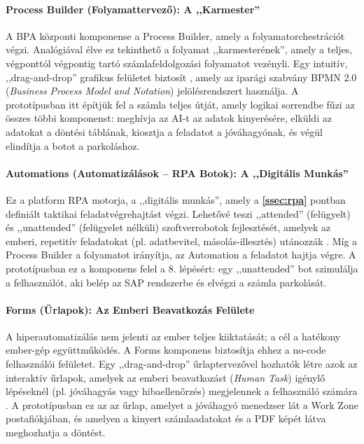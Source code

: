 \paragraph{Process Builder (Folyamattervező): A ,,Karmester''}
A BPA központi komponense a Process Builder, amely a folyamatorchestrációt végzi. Analógiával élve ez tekinthető a folyamat ,,karmesterének'', amely a teljes, végponttól végpontig tartó számlafeldolgozási folyamatot vezényli.
Egy intuitív, ,,drag-and-drop'' grafikus felületet biztosít \cite{SAP-Build}, amely az iparági szabvány BPMN 2.0 (\textit{Business Process Model and Notation}) jelölésrendszert használja.
A prototípusban itt építjük fel a számla teljes útját, amely logikai sorrendbe fűzi az összes többi komponenst: meghívja az AI-t az adatok kinyerésére, elküldi az adatokat a döntési táblának, kiosztja a feladatot a jóváhagyónak, és végül elindítja a botot a parkoláshoz.
\paragraph{Automations (Automatizálások – RPA Botok): A ,,Digitális Munkás''}
Ez a platform RPA motorja, a ,,digitális munkás'', amely a \textbf{\ref{ssec:rpa}} pontban definiált taktikai feladatvégrehajtást végzi.
Lehetővé teszi ,,attended'' (felügyelt) és ,,unattended'' (felügyelet nélküli) szoftverrobotok fejlesztését, amelyek az emberi, repetitív feladatokat (pl. adatbevitel, másolás-illesztés) utánozzák \cite{SAP-Build}.
Míg a Process Builder a folyamatot irányítja, az Automation a feladatot hajtja végre.
A prototípusban ez a komponens felel a 8. lépésért: egy ,,unattended'' bot szimulálja a felhasználót, aki belép az SAP rendszerbe és elvégzi a számla parkolását.
\paragraph{Forms (Űrlapok): Az Emberi Beavatkozás Felülete}
A hiperautomatizálás nem jelenti az ember teljes kiiktatását; a cél a hatékony ember-gép együttműködés.
A Forms komponens biztosítja ehhez a no-code felhasználói felületet. Egy ,,drag-and-drop'' űrlaptervezővel hozhatók létre azok az interaktív űrlapok, amelyek az emberi beavatkozást (\textit{Human Task}) igénylő lépéseknél (pl. jóváhagyás vagy hibaellenőrzés) megjelennek a felhasználó számára \cite{SAP-Build}.
A prototípusban ez az az űrlap, amelyet a jóváhagyó menedzser lát a Work Zone postafiókjában, és amelyen a kinyert számlaadatokat és a PDF képét látva meghozhatja a döntést.
